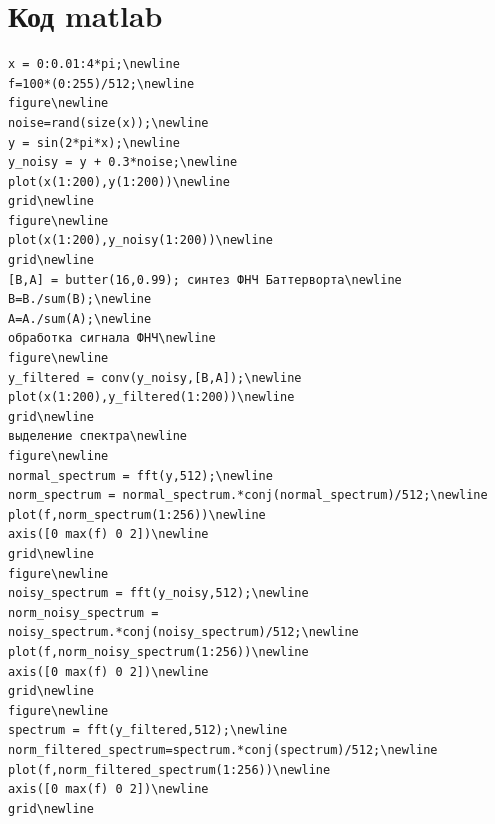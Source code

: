 \documentclass[10pt,a4paper]{report}
\begin{document}
\section{Код matlab}
\begin{verbatim}
x = 0:0.01:4*pi;\newline
f=100*(0:255)/512;\newline
figure\newline
noise=rand(size(x));\newline
y = sin(2*pi*x);\newline
y_noisy = y + 0.3*noise;\newline
plot(x(1:200),y(1:200))\newline
grid\newline
figure\newline
plot(x(1:200),y_noisy(1:200))\newline
grid\newline
[B,A] = butter(16,0.99); синтез ФНЧ Баттерворта\newline 
B=B./sum(B);\newline
A=A./sum(A);\newline
обработка сигнала ФНЧ\newline
figure\newline
y_filtered = conv(y_noisy,[B,A]);\newline
plot(x(1:200),y_filtered(1:200))\newline
grid\newline
выделение спектра\newline
figure\newline
normal_spectrum = fft(y,512);\newline
norm_spectrum = normal_spectrum.*conj(normal_spectrum)/512;\newline
plot(f,norm_spectrum(1:256))\newline
axis([0 max(f) 0 2])\newline
grid\newline
figure\newline
noisy_spectrum = fft(y_noisy,512);\newline
norm_noisy_spectrum = noisy_spectrum.*conj(noisy_spectrum)/512;\newline
plot(f,norm_noisy_spectrum(1:256))\newline
axis([0 max(f) 0 2])\newline
grid\newline
figure\newline
spectrum = fft(y_filtered,512);\newline
norm_filtered_spectrum=spectrum.*conj(spectrum)/512;\newline
plot(f,norm_filtered_spectrum(1:256))\newline
axis([0 max(f) 0 2])\newline
grid\newline
\end{verbatim}
\end{document}
